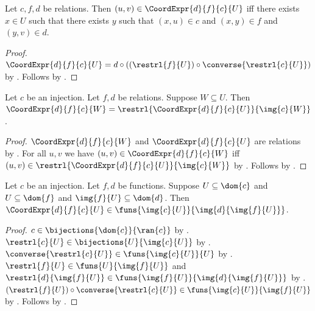 \begin{theorem}\label{coordinate_expression_pair_iff}
    Let $c,f,d$ be relations.
    Then $(u,v)\in\CoordExpr{d}{f}{c}{U}$ iff
        there exists $x\in U$ such that there exists $y$ such that
            $(x,u)\in c$ and $(x,y)\in f$ and $(y,v)\in d$.
\end{theorem}
\begin{proof}
    $\CoordExpr{d}{f}{c}{U}=d\circ((\restrl{f}{U})\circ\converse{\restrl{c}{U}})$ by
        .
    Follows by .
\end{proof}

\begin{theorem}\label{coordinate_expression_restriction}
    Let $c$ be an injection.
    Let $f,d$ be relations.
    Suppose $W\subseteq U$.
    Then $\CoordExpr{d}{f}{c}{W}=\restrl{\CoordExpr{d}{f}{c}{U}}{\img{c}{W}}$.
\end{theorem}
\begin{proof}
    $\CoordExpr{d}{f}{c}{W}$ and $\CoordExpr{d}{f}{c}{U}$ are relations by
        .
    For all $u,v$ we have $(u,v)\in\CoordExpr{d}{f}{c}{W}$ iff
        $(u,v)\in\restrl{\CoordExpr{d}{f}{c}{U}}{\img{c}{W}}$ by
        .
    Follows by .
\end{proof}

\begin{theorem}\label{coordinate_expression_type}
    Let $c$ be an injection.
    Let $f,d$ be functions.
    Suppose $U\subseteq\dom{c}$ and $U\subseteq\dom{f}$ and
        $\img{f}{U}\subseteq\dom{d}$.
    Then $\CoordExpr{d}{f}{c}{U}\in\funs{\img{c}{U}}{\img{d}{\img{f}{U}}}$.
\end{theorem}
\begin{proof}
    $c\in\bijections{\dom{c}}{\ran{c}}$ by
        .
    $\restrl{c}{U}\in\bijections{U}{\img{c}{U}}$ by
        .
    $\converse{\restrl{c}{U}}\in\funs{\img{c}{U}}{U}$ by
        .
    $\restrl{f}{U}\in\funs{U}{\img{f}{U}}$ and
        $\restrl{d}{\img{f}{U}}\in\funs{\img{f}{U}}{\img{d}{\img{f}{U}}}$ by
        .
    $(\restrl{f}{U})\circ\converse{\restrl{c}{U}}
        \in\funs{\img{c}{U}}{\img{f}{U}}$ by .
    Follows by .
\end{proof}

